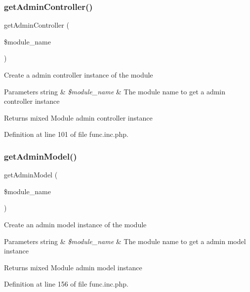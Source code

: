 \subsubsection{\texorpdfstring{get\+Admin\+Controller()}{getAdminController()}}
{\footnotesize\ttfamily get\+Admin\+Controller (\begin{DoxyParamCaption}\item[{}]{\$module\+\_\+name }\end{DoxyParamCaption})}

Create a admin controller instance of the module


\begin{DoxyParams}[1]{Parameters}
string & {\em \$module\+\_\+name} & The module name to get a admin controller instance \\
\hline
\end{DoxyParams}
\begin{DoxyReturn}{Returns}
mixed Module admin controller instance 
\end{DoxyReturn}


Definition at line 101 of file func.\+inc.\+php.

\mbox{\label{func_8inc_8php_a902cd0c884e75afab2682fdd3ae3791f}} 
\subsubsection{\texorpdfstring{get\+Admin\+Model()}{getAdminModel()}}
{\footnotesize\ttfamily get\+Admin\+Model (\begin{DoxyParamCaption}\item[{}]{\$module\+\_\+name }\end{DoxyParamCaption})}

Create an admin model instance of the module


\begin{DoxyParams}[1]{Parameters}
string & {\em \$module\+\_\+name} & The module name to get a admin model instance \\
\hline
\end{DoxyParams}
\begin{DoxyReturn}{Returns}
mixed Module admin model instance 
\end{DoxyReturn}


Definition at line 156 of file func.\+inc.\+php.

